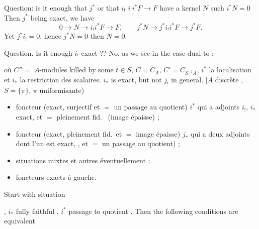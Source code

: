 \documentclass[11pt,a4paper]{article}
\begin{document}
Question: is it enough that $j^{*}$ \ill{} or that $i_{!}$
 $i_{!} i^{*}F \to F$ have a kernel $N$ such 
$i^{*}N = 0$ \ill{} Then $j^{*}$ being exact, we have
\[
  0 \to N \to i_{!} i^{*} F \to F , \qquad j^{*}N \to j^{*} i_{!} i^{*} F
  \to j^{*}F .
\]
Yet $j^{*} i_{!} = 0$, hence \ill{} $j^{*}N = 0$ then $N = 0$.

Question. Is it enough $i_{!}$ exact ?? No, as we see in the case dual to :


où $C'' = $ $A$-modules \ill{} killed by some $t \in S$, $C = C_{A}$,
$C' = C_{S^{-1}A}$, $i^{*}$ la localisation et $i_{*}$ la restriction des
scalaires. $i_{*}$ is exact, but not $j_{!}$ in general.
[$A$ \struck{\ill{}} discrète \ill{}, $S = \{\pi\}$, $\pi$ uniformisante)


\begin{itemize}
\item foncteur (exact, surjectif et $=$ un passage au quotient) $i^{*}$ qui a
       adjoints $i_{!}$, $i_{*}$  exact, et $=$
      pleinement fid.\ \ill{} (image épaisse) ;
\item foncteur (exact, pleinement fid.\ et $=$ \ill{} image épaisse) $j_{*}$
      qui a deux adjoints  dont l'un  est
      exact, , et $=$ un passage au quotient) ;
\item situations mixtes  et autres
      éventuellement ;
\item foncteurs exacts à gauche.
\end{itemize}

Start with situation


, $i_{*}$ fully faithful \struck{\ill{}}, $i^{*}$ 
passage to quotient \struck{\ill{}}. Then the following conditions are
equivalent
\end{document}
